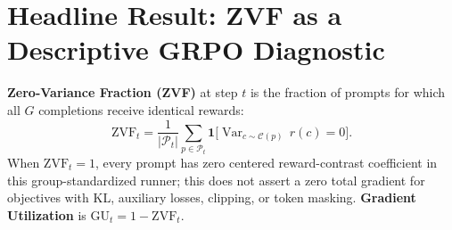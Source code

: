 \documentclass{article}
\begin{document}
\begin{table}[htbp]
\centering\scriptsize
\setlength{\tabcolsep}{3pt}
\caption{Per-family run configurations behind the main-text numbers, as
recorded in the per-run JSON files (\texttt{experiments/tinker-runs/results/},
\texttt{platform\_tinker/reports/final/}) and W\&B run configs. ``P/step'' is
prompts per optimizer step; ``Max tok'' is the training sampler's
generation cap, taken from the W\&B config (matched budget) or from the
committed driver \texttt{world\_class\_experiments.py} (case-study rows;
temperature 0.8). ``n.r.'' means not recorded in the run record.}
\label{tab:configs}
\end{table}

\section{Headline Result: ZVF as a Descriptive GRPO Diagnostic}
\label{sec:zvf-analysis}

\textbf{Zero-Variance Fraction (ZVF)} at step $t$ is the fraction of prompts
for which all $G$ completions receive identical rewards:
\[
  \mathrm{ZVF}_t = \frac{1}{|\mathcal{P}_t|}\sum_{p \in \mathcal{P}_t}
  \mathbf{1}\bigl[\operatorname{Var}_{c \sim \mathcal{C}(p)}\,r(c) = 0\bigr].
\]
When $\mathrm{ZVF}_t = 1$, every prompt has zero centered reward-contrast
coefficient in this group-standardized runner; this does not assert a zero total
gradient for objectives with KL, auxiliary losses, clipping, or token masking.
\textbf{Gradient Utilization} is $\mathrm{GU}_t = 1 - \mathrm{ZVF}_t$.
\end{document}
